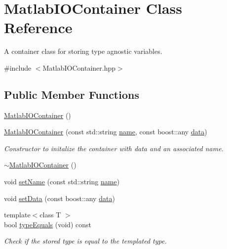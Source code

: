 \hypertarget{classMatlabIOContainer}{}\section{Matlab\+I\+O\+Container Class Reference}
\label{classMatlabIOContainer}


A container class for storing type agnostic variables.  




{\ttfamily \#include $<$Matlab\+I\+O\+Container.\+hpp$>$}

\subsection*{Public Member Functions}
\begin{DoxyCompactItemize}
\item 
\hyperlink{classMatlabIOContainer_a0e5bc58bdbbcbd204ab05db007a2d517}{Matlab\+I\+O\+Container} ()
\item 
\hyperlink{classMatlabIOContainer_aaab5229c9da72d2f1c607c61f0d423e7}{Matlab\+I\+O\+Container} (const std\+::string \hyperlink{classMatlabIOContainer_adf16c7d11599cb42dc79719bb055bcc9}{name}, const boost\+::any \hyperlink{classMatlabIOContainer_ae99926a6f2e0112ba814fdd82f7e0655}{data})
\begin{DoxyCompactList}\small\item\em Constructor to initalize the container with data and an associated name. \end{DoxyCompactList}\item 
\hyperlink{classMatlabIOContainer_a46ca3eac34ba7875c35aee399630dd55}{$\sim$\+Matlab\+I\+O\+Container} ()
\item 
void \hyperlink{classMatlabIOContainer_adf010d08e4a0d64490bea465e3f97d3e}{set\+Name} (const std\+::string \hyperlink{classMatlabIOContainer_adf16c7d11599cb42dc79719bb055bcc9}{name})
\item 
void \hyperlink{classMatlabIOContainer_a0f38e59d5b11ca4df8dad494bc86996c}{set\+Data} (const boost\+::any \hyperlink{classMatlabIOContainer_ae99926a6f2e0112ba814fdd82f7e0655}{data})
\item 
{\footnotesize template$<$class T $>$ }\\bool \hyperlink{classMatlabIOContainer_a7410b35f8d07409c20123d979e7b0e23}{type\+Equals} (void) const 
\begin{DoxyCompactList}\small\item\em Check if the stored type is equal to the templated type. \end{DoxyCompactList}\item 

\end{DoxyCompactItemize}
